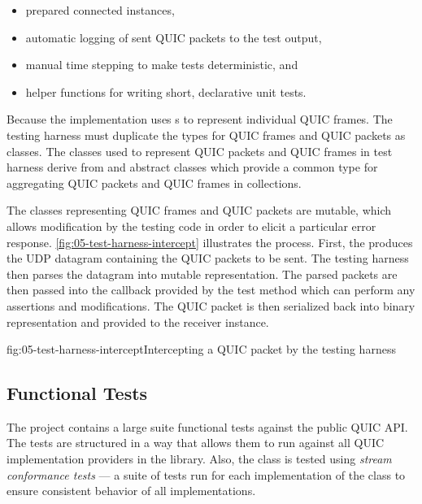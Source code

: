 \begin{itemize}

  \item prepared connected \ManagedQuicConnection{} instances,

  \item automatic logging of sent QUIC packets to the test output,

  \item manual time stepping to make tests deterministic, and

  \item helper functions for writing short, declarative unit tests.

\end{itemize}

Because the \ManagedQuicConnection{} implementation uses s to represent
individual QUIC frames. The testing harness must duplicate the types for QUIC frames and QUIC
packets as classes. The classes used to represent QUIC packets and QUIC frames in test harness
derive from  and  abstract classes which provide a common type
for aggregating QUIC packets and QUIC frames in collections.

The classes representing QUIC frames and QUIC packets are mutable, which allows modification by the
testing code in order to elicit a particular error response. \autoref{fig:05-test-harness-intercept}
illustrates the process. First, the \ManagedQuicConnection{} produces the UDP datagram containing
the QUIC packets to be sent. The testing harness then parses the datagram into mutable
representation. The parsed packets are then passed into the callback provided by the test method
which can perform any assertions and modifications. The QUIC packet is then serialized back into
binary representation and provided to the receiver \ManagedQuicConnection{} instance.

\begin{myFigure}{fig:05-test-harness-intercept}{Intercepting a QUIC packet by the testing harness}

  \resizebox{\textwidth}{!}{}

\end{myFigure}

\subsection{Functional Tests}

The  project contains a large suite functional tests against the public
QUIC API. The tests are structured in a way that allows them to run against all QUIC implementation
providers in the library. Also, the \QuicStream{} class is tested using \textit{stream conformance
  tests} --- a suite of tests run for each implementation of the \Stream{} class to ensure consistent
behavior of all implementations.

